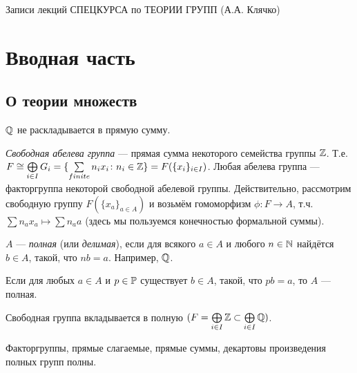 \documentclass[10pt,a4paper,draft]{article}
\begin{document}
\begin{center}{\sf Записи лекций СПЕЦКУРСА по ТЕОРИИ ГРУПП (А.А.
Клячко)}
\end{center}
\section{Вводная часть}
\subsection{О теории множеств}

\begin{problem}$\mathbb Q$ не раскладывается в прямую
сумму.
\end{problem}

\emph{Свободная абелева группа}
--- прямая сумма некоторого семейства группы $\mathbb Z$. Т.е. $F\cong
\bigoplus\limits_{i\in I}G_i=\{\sum\limits_{finite}n_i x_i\colon
n_i\in\mathbb Z\}=F(\{x_i\}_{i\in I})$. Любая абелева группа
--- факторгруппа некоторой свободной абелевой группы.
Действительно, рассмотрим свободную группу $F(\{x_a\}_{a\in A})$ и
возьмём гомоморфизм $\phi\colon F\rightarrow A$, т.ч. $\sum n_a
x_a\mapsto\sum n_a a$ (здесь мы пользуемся конечностью формальной
суммы).

$A$ ---  \emph{полная} (или
\emph{делимая}), если для всякого $a\in A$ и
любого $n\in\mathbb N$ найдётся $b\in A$, такой, что $nb=a$. Например,
$\mathbb Q$.

\begin{stm} Если для любых $a\in A$ и
$p\in \mathbb P$ существует $b\in A$, такой, что $pb=a$, то $A$ ---
полная.
\end{stm}

\begin{stm} Свободная группа вкладывается в полную
$(F=\bigoplus\limits_{i\in I}\mathbb Z\subset\bigoplus\limits_{i\in
I}\mathbb Q)$.
\end{stm}

\begin{stm} Факторгруппы, прямые слагаемые, прямые суммы,
декартовы произведения полных групп полны.
\end{stm}
\end{document}
